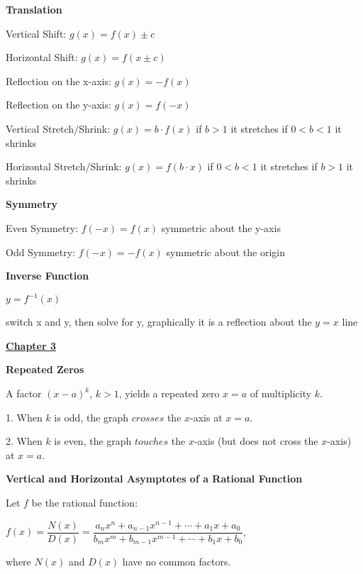 \documentclass{article}
\begin{document}
\begin{large}
\textbf{Translation}

Vertical Shift: \hspace{1.45in} $g(x)=f(x)\pm c$

Horizontal Shift: \hspace{1.35in}$g(x)=f(x\pm c)$

Reflection on the x-axis: \hspace{0.8in}$g(x)=-f(x)$

Reflection on the y-axis: \hspace{0.8in}$g(x)=f(-x)$

Vertical Stretch/Shrink: \hspace{0.8in}$g(x)=b\cdot f(x)$ if $b>1$ it stretches if $0<b<1$ it shrinks

Horizontal Stretch/Shrink: \hspace{0.6in}$g(x)=f(b\cdot x)$ if $0<b<1$ it stretches if $b>1$ it shrinks

\textbf{Symmetry}

Even Symmetry: \hspace{1.0in}$f(-x)=f(x)$ symmetric about the y-axis

Odd Symmetry: \hspace{1.0in}$f(-x)=-f(x)$ symmetric about the origin

\textbf{Inverse Function}

\hspace{2.0in}$y=f^{-1}(x)$ 

switch x and y, then solve for y, graphically it is a reflection about the $y=x$ line

\vspace{0.5in}
\underline{\textbf{\huge Chapter 3 \phantom{ } \phantom{ } \phantom{ } \phantom{ }}}

\textbf{Repeated Zeros}

A factor $(x-a)^{k}$, $k > 1$, yields a repeated zero $x = a$ of multiplicity $k$.

1. When $k$ is odd, the graph $crosses$ the $x$-axis at $x = a$.

2. When $k$ is even, the graph $touches$ the $x$-axis (but does not cross the $x$-axis) at $x = a$.

\vspace{1.0in}

\textbf{Vertical and Horizontal Asymptotes of a Rational Function}

\hspace{0.1in} Let $f$ be the rational function:

\hspace{0.2in} $f(x) = \dfrac{N(x)}{D(x)} = \dfrac{a_{n}x^{n} + a_{n-1}x^{n-1} + \cdots + a_{1}x + a_{0}}{b_{m}x^{m} + b_{m-1}x^{m-1} + \cdots + b_{1}x + b_{0}}$,\ \begin{normalsize}where $N(x)$ and $D(x)$ have no common factors.\end{normalsize}


\end{large}
\end{document}
